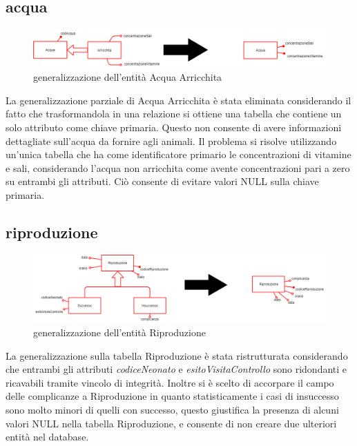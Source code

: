 \documentclass[12pt,a4paper]{article}
\begin{document}
\subsection{acqua}
\begin{figure}[H]
\centering
\includegraphics[scale=2, width=1.15\textwidth]{ridondanze/acqua.png}
\caption{ge\-ne\-ra\-liz\-za\-zio\-ne dell'entità Acqua Arricchita}
\end{figure}
La ge\-ne\-ra\-liz\-za\-zio\-ne parziale di Acqua Arricchita è stata eliminata considerando il fatto che trasformandola in una relazione si ottiene una tabella che contiene un solo attributo come chiave primaria. Questo non consente di avere informazioni dettagliate sull'acqua da fornire agli animali. Il problema si risolve utilizzando un'unica tabella che ha come identificatore primario le concentrazioni di vitamine e sali, considerando l'acqua non arricchita come avente concentrazioni pari a zero su entrambi gli attributi. Ciò consente di evitare valori NULL sulla chiave primaria.
\subsection{riproduzione}
\begin{figure}[H]
\centering
\includegraphics[scale=2, width=1.15\textwidth]{ridondanze/riproduzione.png}
\caption{ge\-ne\-ra\-liz\-za\-zio\-ne dell'entità Riproduzione}
\end{figure}
La ge\-ne\-ra\-liz\-za\-zio\-ne sulla tabella Riproduzione è stata ristrutturata considerando che entrambi gli attributi \textit{codiceNeonato} e \textit{esitoVisitaControllo} sono ridondanti e ricavabili tramite vincolo di integrità. Inoltre si è scelto di accorpare il campo delle complicanze a Riproduzione in quanto statisticamente i casi di insuccesso sono molto minori di quelli con successo, questo giustifica la presenza di alcuni valori NULL nella tabella Riproduzione, e consente di non creare due ulteriori entità nel database.
\end{document}
